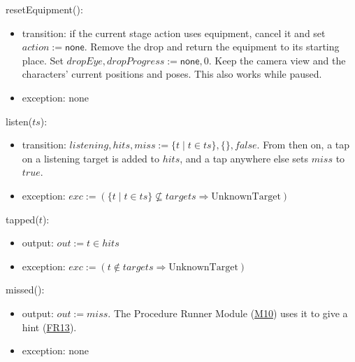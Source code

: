\documentclass[10pt, titlepage]{article}
\newcommand{\srsurl}{https://team-hindsight.github.io/ophthamology-game/SRS/SRS.pdf}
\newcommand{\srsitemref}[2]{\href{\srsurl\#nameddest=#1}{#2}}
\newcommand{\misref}[2]{\hyperref[mis:#1]{M#2}}
\newcommand{\T}[1]{\mathit{#1}}          %
\newcommand{\V}[1]{\mathsf{#1}}          %
\newcommand{\out}{\mathit{out}}
\newcommand{\exc}{\mathit{exc}}
\newcommand{\true}{\mathit{true}}
\newcommand{\false}{\mathit{false}}
\begin{document}
\begin{samepage}
\noindent resetEquipment():
\begin{itemize}
\item transition: if the current stage action uses equipment, cancel it
  and set $\T{action} := \V{none}$. Remove the drop and return the
  equipment to its starting place. Set
  $\T{dropEye}, \T{dropProgress} := \V{none},0$. Keep the camera view
  and the characters' current positions and poses. This also works while paused.
\item exception: none
\end{itemize}
\end{samepage}
\par\pagebreak[0]

\begin{samepage}
\noindent listen($\T{ts}$):
\begin{itemize}
\item transition: $\T{listening}, \T{hits}, \T{miss} := \{t \mid t \in
  \T{ts}\}, \{\}, \false$. From then on, a tap on a listening target is added to $\T{hits}$,
  and a tap anywhere else sets $\T{miss}$ to $\true$.
\item exception: $\exc := (\{t \mid t \in \T{ts}\} \not\subseteq \T{targets} \Rightarrow
  \text{UnknownTarget})$
\end{itemize}
\end{samepage}
\par\pagebreak[0]

\begin{samepage}
\noindent tapped($t$):
\begin{itemize}
\item output: $\out := t \in \T{hits}$
\item exception: $\exc := (t \notin \T{targets} \Rightarrow
  \text{UnknownTarget})$
\end{itemize}
\end{samepage}
\par\pagebreak[0]

\begin{samepage}
\noindent missed():
\begin{itemize}
\item output: $\out := \T{miss}$. The Procedure Runner Module (\misref{Runner}{10}) uses it to
  give a hint (\srsitemref{FR_HintOnMiss}{FR13}).
\item exception: none
\end{itemize}
\end{samepage}
\par\pagebreak[0]
\end{document}
